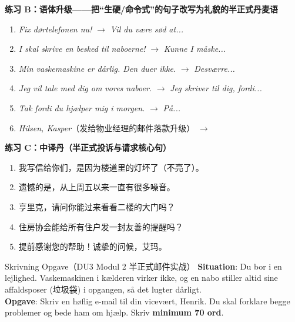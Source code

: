 \textbf{练习 B：语体升级——把“生硬/命令式”的句子改写为礼貌的半正式丹麦语}
\begin{enumerate}
  \item \textit{Fix dørtelefonen nu!} $\rightarrow$ \textit{Vil du være sød at...}
  \item \textit{I skal skrive en besked til naboerne!} $\rightarrow$ \textit{Kunne I måske...}
  \item \textit{Min vaskemaskine er dårlig. Den duer ikke.} $\rightarrow$ \textit{Desværre...}
  \item \textit{Jeg vil tale med dig om vores naboer.} $\rightarrow$ \textit{Jeg skriver til dig, fordi...}
  \item \textit{Tak fordi du hjælper mig i morgen.} $\rightarrow$ \textit{På...}
  \item \textit{Hilsen, Kasper}（发给物业经理的邮件落款升级） $\rightarrow$
\end{enumerate}

\textbf{练习 C：中译丹（半正式投诉与请求核心句）}
\begin{enumerate}
  \item 我写信给你们，是因为楼道里的灯坏了（不亮了）。
  \item 遗憾的是，从上周五以来一直有很多噪音。
  \item 亨里克，请问你能过来看看二楼的大门吗？
  \item 住房协会能给所有住户发一封友善的提醒吗？
  \item 提前感谢您的帮助！诚挚的问候，艾玛。
\end{enumerate}


\begin{emailbox}{Skrivning Opgave（DU3 Modul 2 半正式邮件实战）}
\textbf{Situation}: Du bor i en lejlighed. Vaskemaskinen i kælderen virker ikke, og en nabo stiller altid sine affaldsposer (垃圾袋) i opgangen, så det lugter dårligt.\\
\textbf{Opgave}: Skriv en høflig e-mail til din vicevært, Henrik. Du skal forklare begge problemer og bede ham om hjælp. Skriv \textbf{minimum 70 ord}.
\end{emailbox}

